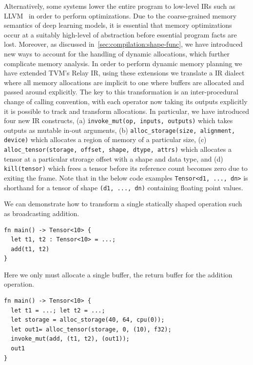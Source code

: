 Alternatively, some systems lower the entire program to low-level IRs such as LLVM~\citep{llvm} in order to perform optimizations. Due to the coarse-grained memory semantics of deep learning models, it is essential that memory optimizations occur at a suitably high-level of abstraction before essential program facts are lost. Moreover, as discussed in~\autoref{sec:compilation:shape-func}, we have introduced new ways to account for the handling of dynamic allocations, which further complicate memory analysis.
In order to perform dynamic memory planning we have extended TVM's Relay IR, using these extensions we translate a IR dialect where all memory allocations are implicit to one where buffers are allocated and passed around explicitly. The key to this transformation is an inter-procedural change of calling convention, with each operator now taking its outputs explicitly it is possible to track and transform allocations.
In particular, we have introduced four new IR constructs, (a) \verb|invoke_mut(op, inputs, outputs)| which takes outputs as mutable in-out arguments, (b) \texttt{alloc\_storage(size, alignment, device)} which allocates a region of memory of a particular size, (c) \texttt{alloc\_tensor(storage, offset, shape, dtype, attrs)} which allocates a tensor at a particular strorage offset with a shape and data type, and (d) \verb|kill(tensor)| which frees a tensor before its reference count becomes zero due to exiting the frame. Note that in the below code examples \texttt{Tensor<d1, ..., dn>} is shorthand for a tensor of shape \texttt{(d1, ..., dn)} containing floating point values.

We can demonstrate how to transform a single statically shaped operation such as broadcasting addition.

\begin{verbatim}
fn main() -> Tensor<10> {
  let t1, t2 : Tensor<10> = ...;
  add(t1, t2)
}
\end{verbatim}

Here we only must allocate a single buffer, the return buffer for the addition operation.

\begin{verbatim}
fn main() -> Tensor<10> {
  let t1 = ...; let t2 = ...;
  let storage = alloc_storage(40, 64, cpu(0));
  let out1= alloc_tensor(storage, 0, (10), f32);
  invoke_mut(add, (t1, t2), (out1));
  out1
}
\end{verbatim}

